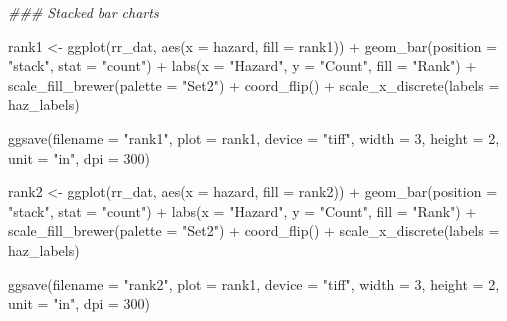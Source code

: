 \documentclass[
  letterpaper,
  DIV=11,
  numbers=noendperiod]{scrartcl}
\newenvironment{Shaded}{\begin{snugshade}}{\end{snugshade}}
\newcommand{\AttributeTok}[1]{\textcolor[rgb]{0.40,0.45,0.13}{#1}}
\newcommand{\DecValTok}[1]{\textcolor[rgb]{0.68,0.00,0.00}{#1}}
\newcommand{\DocumentationTok}[1]{\textcolor[rgb]{0.37,0.37,0.37}{\textit{#1}}}
\newcommand{\FunctionTok}[1]{\textcolor[rgb]{0.28,0.35,0.67}{#1}}
\newcommand{\NormalTok}[1]{\textcolor[rgb]{0.00,0.23,0.31}{#1}}
\newcommand{\OtherTok}[1]{\textcolor[rgb]{0.00,0.23,0.31}{#1}}
\newcommand{\SpecialCharTok}[1]{\textcolor[rgb]{0.37,0.37,0.37}{#1}}
\newcommand{\StringTok}[1]{\textcolor[rgb]{0.13,0.47,0.30}{#1}}
\begin{document}
\begin{Shaded}
\begin{Highlighting}[]
\DocumentationTok{\#\#\# Stacked bar charts}

\NormalTok{rank1 }\OtherTok{\textless{}{-}} \FunctionTok{ggplot}\NormalTok{(rr\_dat, }\FunctionTok{aes}\NormalTok{(}\AttributeTok{x =}\NormalTok{ hazard, }\AttributeTok{fill =}\NormalTok{ rank1)) }\SpecialCharTok{+}
    \FunctionTok{geom\_bar}\NormalTok{(}\AttributeTok{position =} \StringTok{"stack"}\NormalTok{, }\AttributeTok{stat =} \StringTok{"count"}\NormalTok{) }\SpecialCharTok{+}
    \FunctionTok{labs}\NormalTok{(}\AttributeTok{x =} \StringTok{"Hazard"}\NormalTok{, }\AttributeTok{y =} \StringTok{"Count"}\NormalTok{, }\AttributeTok{fill =} \StringTok{"Rank"}\NormalTok{) }\SpecialCharTok{+}
    \FunctionTok{scale\_fill\_brewer}\NormalTok{(}\AttributeTok{palette =} \StringTok{"Set2"}\NormalTok{) }\SpecialCharTok{+}
    \FunctionTok{coord\_flip}\NormalTok{() }\SpecialCharTok{+}
    \FunctionTok{scale\_x\_discrete}\NormalTok{(}\AttributeTok{labels =}\NormalTok{ haz\_labels)}

\FunctionTok{ggsave}\NormalTok{(}\AttributeTok{filename =} \StringTok{"rank1"}\NormalTok{, }\AttributeTok{plot =}\NormalTok{ rank1, }\AttributeTok{device =} \StringTok{"tiff"}\NormalTok{, }\AttributeTok{width =} \DecValTok{3}\NormalTok{, }\AttributeTok{height =} \DecValTok{2}\NormalTok{, }\AttributeTok{unit =} \StringTok{"in"}\NormalTok{, }\AttributeTok{dpi =} \DecValTok{300}\NormalTok{)}

\NormalTok{rank2 }\OtherTok{\textless{}{-}} \FunctionTok{ggplot}\NormalTok{(rr\_dat, }\FunctionTok{aes}\NormalTok{(}\AttributeTok{x =}\NormalTok{ hazard, }\AttributeTok{fill =}\NormalTok{ rank2)) }\SpecialCharTok{+}
    \FunctionTok{geom\_bar}\NormalTok{(}\AttributeTok{position =} \StringTok{"stack"}\NormalTok{, }\AttributeTok{stat =} \StringTok{"count"}\NormalTok{) }\SpecialCharTok{+}
    \FunctionTok{labs}\NormalTok{(}\AttributeTok{x =} \StringTok{"Hazard"}\NormalTok{, }\AttributeTok{y =} \StringTok{"Count"}\NormalTok{, }\AttributeTok{fill =} \StringTok{"Rank"}\NormalTok{) }\SpecialCharTok{+}
     \FunctionTok{scale\_fill\_brewer}\NormalTok{(}\AttributeTok{palette =} \StringTok{"Set2"}\NormalTok{) }\SpecialCharTok{+}
    \FunctionTok{coord\_flip}\NormalTok{() }\SpecialCharTok{+}
    \FunctionTok{scale\_x\_discrete}\NormalTok{(}\AttributeTok{labels =}\NormalTok{ haz\_labels)}

\FunctionTok{ggsave}\NormalTok{(}\AttributeTok{filename =} \StringTok{"rank2"}\NormalTok{, }\AttributeTok{plot =}\NormalTok{ rank1, }\AttributeTok{device =} \StringTok{"tiff"}\NormalTok{, }\AttributeTok{width =} \DecValTok{3}\NormalTok{, }\AttributeTok{height =} \DecValTok{2}\NormalTok{, }\AttributeTok{unit =} \StringTok{"in"}\NormalTok{, }\AttributeTok{dpi =} \DecValTok{300}\NormalTok{)}


\end{Highlighting}
\end{Shaded}
\end{document}

